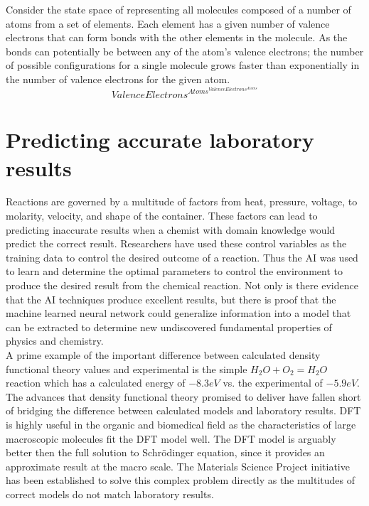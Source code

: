 \documentclass{article}
\begin{document}
Consider the state space of representing all molecules composed of a number of atoms from a set of elements. Each element has a given number of valence electrons that can form bonds with the other elements in the molecule. As the bonds can potentially be between any of the atom's valence electrons; the number of possible configurations for a single molecule grows faster than exponentially in the number of valence electrons for the given atom. \\

$${ValenceElectrons} ^ {Atoms ^ {ValenceElectrons^{Atoms}}}$$ 

\newpage
\section{Predicting accurate laboratory results}

Reactions are governed by a multitude of factors from heat, pressure, voltage, to molarity, velocity, and shape of the container. These factors can lead to predicting inaccurate results when a chemist with domain knowledge would predict the correct result. Researchers have used these control variables as the training data to control the desired outcome of a reaction.\cite{NICKEL}\cite{TENSOR}  Thus the AI was used to learn and determine the optimal parameters to control the environment to produce the desired result from the chemical reaction. Not only is there evidence that the AI techniques produce excellent results, but there is proof that the machine learned neural network could generalize information into a model that can be extracted to determine new undiscovered fundamental properties of physics and chemistry. \\

A prime example of the important difference between calculated density functional theory values and experimental is the simple $H_2O + O_2 = H_2O$ reaction which has a calculated energy of $-8.3eV$ vs. the experimental of $-5.9eV$.  The advances that density functional theory promised to deliver have fallen short of bridging the difference between calculated models and laboratory results. DFT is highly useful in the organic and biomedical field as the characteristics of large macroscopic molecules fit the DFT model well. The DFT model is arguably better then the full solution to Schr\"{o}dinger equation, since it provides an approximate result at the macro scale. The Materials Science Project initiative has been established to solve this complex problem directly as the multitudes of correct models do not match laboratory results. \\
\end{document}
